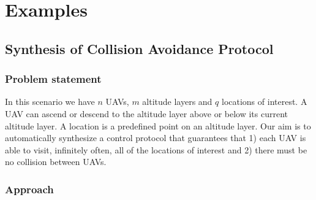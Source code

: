 \documentclass[]{article}
\author{}
\date{}
\begin{document}
\section{Examples}\label{examples}

\subsection{Synthesis of Collision Avoidance
Protocol}\label{synthesis-collision-avoidance-protocol}

\subsubsection{Problem statement}\label{problem-statement}

In this scenario we have $n$ UAVs, $m$ altitude layers and $q$ locations of
interest. A UAV can ascend or descend to the altitude layer above or
below its current altitude layer. A location is a predefined
point on an altitude layer. Our aim is to automatically synthesize a
control protocol that guarantees that 1) each UAV is able to visit, infinitely
often, all of the locations of interest and 2) there must be no collision 
between UAVs.

\subsubsection{Approach}\label{approach}
\begin{figure}[htp]
    \label{fig:ca}
    \caption{}
\end{figure}
\end{document}
